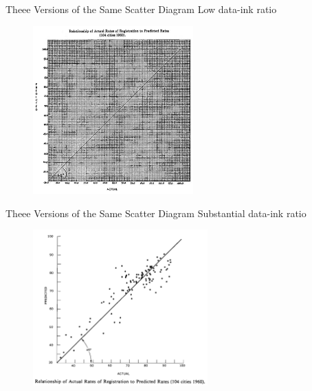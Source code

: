 \documentclass[aspectratio=1610]{beamer}
\begin{document}
\begin{frame}{Theee Versions of the Same Scatter Diagram}
	{Low data-ink ratio}
	\begin{figure}
		\begin{center}
			\includegraphics[width=0.55\textwidth]{images/low.png}
		\end{center}
	\end{figure}
\end{frame}

\begin{frame}{Theee Versions of the Same Scatter Diagram}
	{Substantial data-ink ratio}
	\begin{figure}
		\begin{center}
			\includegraphics[width=0.6\textwidth]{images/high.png}
		\end{center}
	\end{figure}
\end{frame}
\end{document}
